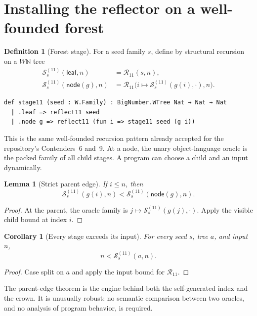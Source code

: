 \documentclass[11pt]{article}
\newtheorem{lemma}[theorem]{Lemma}
\newtheorem{corollary}[theorem]{Corollary}
\theoremstyle{definition}
\newtheorem{definition}[theorem]{Definition}
\theoremstyle{remark}
\newcommand{\N}{\mathbb{N}}
\newcommand{\R}{\mathcal{R}_{11}}
\newcommand{\Sstage}{\mathcal{S}^{(11)}}
\begin{document}
\section{Installing the reflector on a well-founded forest}

\begin{definition}[Forest stage]
For a seed family $s$, define by structural recursion on a $W\N$ tree
\[
\begin{aligned}
  \Sstage_s(\mathsf{leaf},n) &= \R(s,n),\\
  \Sstage_s(\mathsf{node}(g),n)
    &=\R\bigl(i\mapsto \Sstage_s(g(i),\cdot),n\bigr).
\end{aligned}
\]
\end{definition}

\begin{lstlisting}
def stage11 (seed : W.Family) : BigNumber.WTree Nat → Nat → Nat
  | .leaf => reflect11 seed
  | .node g => reflect11 (fun i => stage11 seed (g i))
\end{lstlisting}

This is the same well-founded recursion pattern already accepted for the
repository's Contenders~6 and~9.  At a node, the unary object-language oracle is
the packed family of all child stages.  A program can choose a child and an
input dynamically.

\begin{lemma}[Strict parent edge]
If $i\le n$, then
\[
  \Sstage_s(g(i),n)<\Sstage_s(\mathsf{node}(g),n).
\]
\end{lemma}
\begin{proof}
At the parent, the oracle family is $j\mapsto\Sstage_s(g(j),\cdot)$.  Apply the
visible child bound at index $i$.
\end{proof}

\begin{corollary}[Every stage exceeds its input]
For every seed $s$, tree $a$, and input $n$,
\[
  n<\Sstage_s(a,n).
\]
\end{corollary}
\begin{proof}
Case split on $a$ and apply the input bound for $\R$.
\end{proof}

The parent-edge theorem is the engine behind both the self-generated index and
the crown.  It is unusually robust: no semantic comparison between two
oracles, and no analysis of program behavior, is required.

\end{document}

